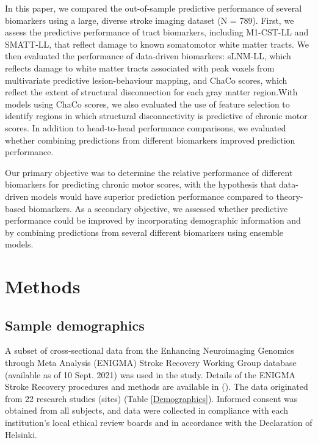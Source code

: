 \documentclass[phd,tocprelim]{cornell}
\begin{document}
In this paper, we compared the out-of-sample predictive performance of several biomarkers using a large, diverse stroke imaging dataset (N = 789). First, we assess the predictive performance of tract biomarkers, including M1-CST-LL and SMATT-LL, that reflect damage to known somatomotor white matter tracts. We then evaluated the performance of data-driven biomarkers: sLNM-LL, which reflects damage to white matter tracts associated with peak voxels from multivariate predictive lesion-behaviour mapping, and ChaCo scores, which reflect the extent of structural disconnection for each gray matter region.With models using ChaCo scores, we also evaluated the use of feature selection to identify regions in which structural disconnectivity is predictive of chronic motor scores. In addition to head-to-head performance comparisons, we evaluated whether combining predictions from  different biomarkers improved prediction performance.

Our primary objective was to determine the relative performance of different biomarkers for predicting chronic motor scores, with the hypothesis that data-driven models would have superior prediction performance compared to theory-based biomarkers. As a secondary objective, we assessed whether predictive performance could be improved by incorporating demographic information and by combining predictions from several different biomarkers using ensemble models.

\section{Methods}

\subsection{Sample demographics}
A subset of cross‐sectional data from the Enhancing Neuroimaging Genomics through Meta Analysis (ENIGMA) Stroke Recovery Working Group database (available as of 10 Sept. 2021) was used in the study. Details of the ENIGMA Stroke Recovery procedures and methods are available in (\cite{Liew2020-ps}). The data originated from 22 research studies (sites) (Table \ref{Demographics}). Informed consent was obtained from all subjects, and data were collected in compliance with each institution’s local ethical review boards and in accordance with the Declaration of Helsinki.
\end{document}
